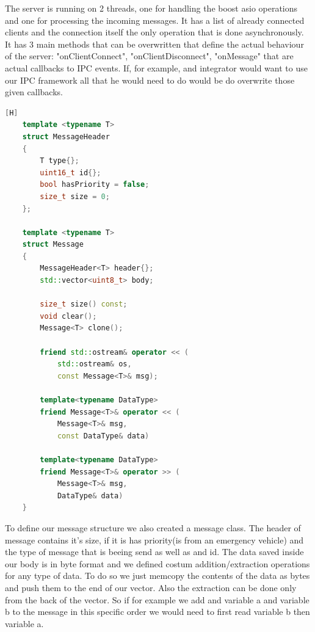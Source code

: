 \documentclass[17pt]{report}
\begin{document}
The server is running on 2 threads, one for handling the boost asio 
operations and one for processing the incoming messages. It has 
a list of already connected clients and the connection itself the only 
operation that is done asynchronously. It has 3 main methods that 
can be overwritten that define the actual behaviour of the server: 
"onClientConnect", "onClientDisconnect", "onMessage" that are actual 
callbacks to IPC events. If, for example, and integrator would want 
to use our IPC framework all that he would need to do would be do 
overwrite those given callbacks.

\pagebreak

\begin{lstlisting}[language = C++][H]
    template <typename T>
    struct MessageHeader
    {
        T type{};
        uint16_t id{};
        bool hasPriority = false;
        size_t size = 0;
    };
    
    template <typename T>
    struct Message
    {
        MessageHeader<T> header{};
        std::vector<uint8_t> body;

        size_t size() const;
        void clear();
        Message<T> clone();

        friend std::ostream& operator << (
            std::ostream& os, 
            const Message<T>& msg);

        template<typename DataType>
        friend Message<T>& operator << (
            Message<T>& msg,
            const DataType& data)
        
        template<typename DataType>
        friend Message<T>& operator >> (
            Message<T>& msg,
            DataType& data)
    }
\end{lstlisting}  

To define our message structure we also created a message class. The 
header of message contains it's size, if it is has priority(is from 
an emergency vehicle) and the type of message that is beeing send as
well as and id. The data saved inside our body is in byte format and 
we defined costum addition/extraction operations for any type of data.
To do so we just memcopy the contents of the data as bytes and push 
them to the end of our vector. Also the extraction can be done only 
from the back of the vector. So if for example we add and variable 
a and variable b to the message in this specific order we would need 
to first read variable b then variable a.
\pagebreak
\end{document}
